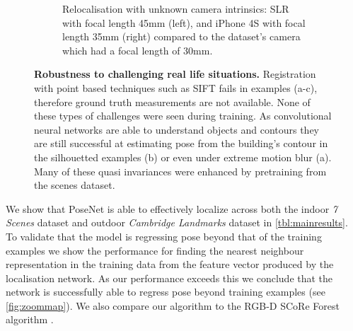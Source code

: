 \begin{figure}[p]
\begin{center}
\begin{subfigure}[t]{0.28\textwidth}
{   	}
   \caption{Relocalisation with unknown camera intrinsics: SLR with focal length 45mm (left), and iPhone 4S with focal length 35mm (right) compared to the dataset's camera which had a focal length of 30mm.}
\end{subfigure}
\end{center}
\vspace{-5mm}
	\caption[Robustness to challenging real life situations.]{\textbf{Robustness to challenging real life situations.} Registration with point based techniques such as SIFT fails in examples (a-c), therefore ground truth measurements are not available. None of these types of challenges were seen during training. As convolutional neural networks are able to understand objects and contours they are still successful at estimating pose from the building's contour in the silhouetted examples (b) or even under extreme motion blur (a). Many of these quasi invariances were enhanced by pretraining from the scenes dataset.}
	\label{fig:difficultexamples}
\clearpage%
\end{figure}

We show that PoseNet is able to effectively localize across both the indoor \textit{7 Scenes} dataset and outdoor \textit{Cambridge Landmarks} dataset in \cref{tbl:mainresults}. To validate that the model is regressing pose beyond that of the training examples we show the performance for finding the nearest neighbour representation in the training data from the feature vector produced by the localisation network. As our performance exceeds this we conclude that the network is successfully able to regress pose beyond training examples (see \cref{fig:zoommap}). We also compare our algorithm to the RGB-D SCoRe Forest algorithm \citep{shotton2013scene}. 

